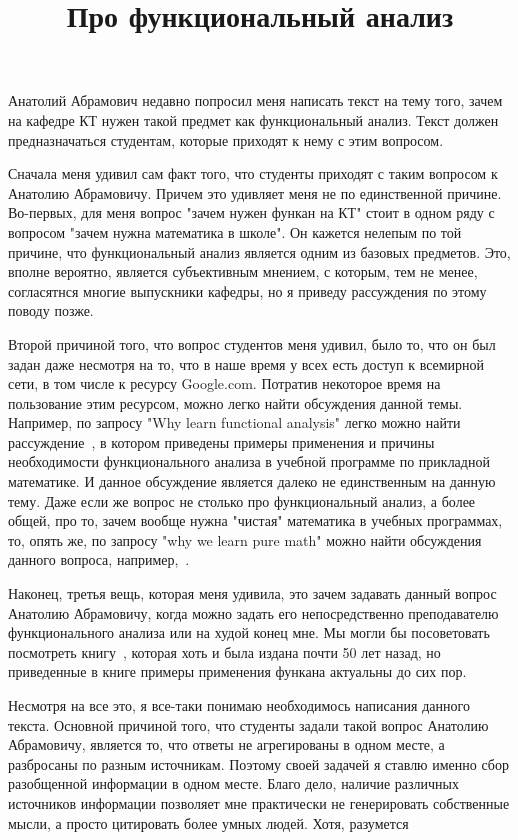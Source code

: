 \documentclass[russian]{article}
\title{Про функциональный анализ}
\begin{document}
\maketitle

Анатолий Абрамович недавно попросил меня написать текст на тему того, зачем на кафедре КТ нужен такой предмет как функциональный анализ. Текст должен предназначаться студентам, которые приходят к нему с этим вопросом.

Сначала меня удивил сам факт того, что студенты приходят с таким вопросом к Анатолию Абрамовичу. Причем это удивляет меня не по единственной причине. Во-первых, для меня вопрос "зачем нужен функан на КТ" стоит в одном ряду с вопросом "зачем нужна математика в школе". Он кажется нелепым по той причине, что функциональный анализ является одним из базовых предметов. Это, вполне вероятно, является субъективным мнением, с которым, тем не менее, согласятнся многие выпускники кафедры, но я приведу рассуждения по этому поводу позже.

Второй причиной того, что вопрос студентов меня удивил, было то, что он был задан даже несмотря на то, что в наше время у всех есть доступ к всемирной сети, в том числе к ресурсу Google.com. Потратив некоторое время на пользование этим ресурсом, можно легко найти обсуждения данной темы. Например, по запросу "Why learn functional analysis" легко можно найти рассуждение~\cite{why-funcan}, в котором приведены примеры применения и причины необходимости функционального анализа в учебной программе по прикладной математике. И данное обсуждение является далеко не единственным на данную тему. Даже если же вопрос не столько про функциональный анализ, а более общей, про то, зачем вообще нужна "чистая" математика в учебных программах, то, опять же, по запросу "why we learn pure math" можно найти обсуждения данного вопроса, например,~\cite{why-pure-math}.

Наконец, третья вещь, которая меня удивила, это зачем задавать данный вопрос Анатолию Абрамовичу, когда можно задать его непосредственно преподавателю функционального анализа или на худой конец мне. Мы могли бы посоветовать посмотреть книгу~\cite{kollats}, которая хоть и была издана почти 50 лет назад, но приведенные в книге примеры применения функана актуальны до сих пор.

Несмотря на все это, я все-таки понимаю необходимось написания данного текста. Основной причиной того, что студенты задали такой вопрос Анатолию Абрамовичу, является то, что ответы не агрегированы в одном месте, а разбросаны по разным источникам. Поэтому своей задачей я ставлю именно сбор разобщенной информации в одном месте. Благо дело, наличие различных источников информации позволяет мне практически не генерировать собственные мысли, а просто цитировать более умных людей. Хотя, разумется
\end{document}
